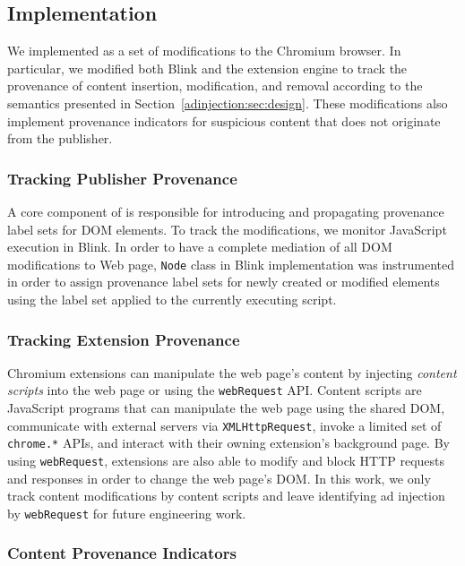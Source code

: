 \subsection{Implementation}
\label{adinjection:sec:impl}

We implemented \origintracer as a set of modifications to the Chromium browser.
In particular, we modified both Blink and the extension engine to track the
provenance of content insertion, modification, and removal according to the
semantics presented in Section~\ref{adinjection:sec:design}. These modifications
also implement provenance indicators for suspicious content that does not
originate from the publisher.

\subsubsection{Tracking Publisher Provenance}

A core component of \origintracer is responsible for introducing and propagating
provenance label sets for DOM elements. To track the modifications, we monitor
JavaScript execution in Blink. In order to have a complete mediation of all DOM
modifications to Web page, \texttt{Node} class in Blink implementation was
instrumented in order to assign provenance label sets for newly created or
modified elements using the label set applied to the currently executing script.

\subsubsection{Tracking Extension Provenance}
\label{adinjection:sec:impl:extension}

Chromium extensions can manipulate the web page's content by injecting
\emph{content scripts} into the web page or using the \texttt{webRequest} API.
Content scripts are JavaScript programs that can manipulate the web page using
the shared DOM, communicate with external servers via \texttt{XMLHttpRequest},
invoke a limited set of \texttt{chrome.*} APIs, and interact with their owning
extension's background page. By using \texttt{webRequest}, extensions are also
able to modify and block HTTP requests and responses in order to change the web
page's DOM. In this work, we only track content modifications by content scripts
and leave identifying ad injection by \texttt{webRequest} for future engineering
work.

\subsubsection{Content Provenance Indicators}
\label{adinjection:sec:impl:indicators}

